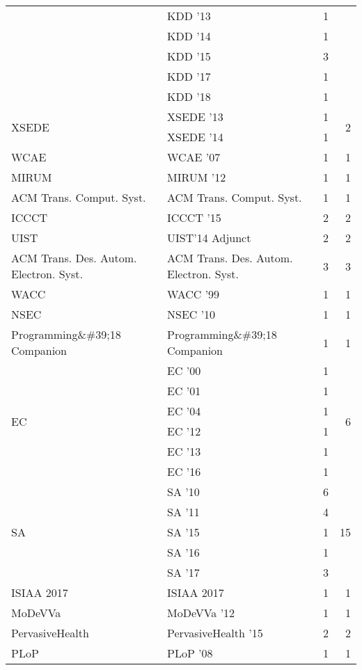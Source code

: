 \begin{table*}[t]
\begin{tabular}{llrr}
& KDD '13 & 1 &\\
& KDD '14 & 1 &\\
& KDD '15 & 3 &\\
& KDD '17 & 1 &\\
& KDD '18 & 1 &\\
\multirow{2}{*}{XSEDE } & XSEDE '13 & 1 & \multirow{2}{*}{2}\\
& XSEDE '14 & 1 &\\
\multirow{1}{*}{WCAE } & WCAE '07 & 1 & \multirow{1}{*}{1}\\
\multirow{1}{*}{MIRUM } & MIRUM '12 & 1 & \multirow{1}{*}{1}\\
\multirow{1}{*}{ACM Trans. Comput. Syst.} & ACM Trans. Comput. Syst. & 1 & \multirow{1}{*}{1}\\
\multirow{1}{*}{ICCCT } & ICCCT '15 & 2 & \multirow{1}{*}{2}\\
\multirow{1}{*}{UIST} & UIST'14 Adjunct & 2 & \multirow{1}{*}{2}\\
\multirow{1}{*}{ACM Trans. Des. Autom. Electron. Syst.} & ACM Trans. Des. Autom. Electron. Syst. & 3 & \multirow{1}{*}{3}\\
\multirow{1}{*}{WACC } & WACC '99 & 1 & \multirow{1}{*}{1}\\
\multirow{1}{*}{NSEC } & NSEC '10 & 1 & \multirow{1}{*}{1}\\
\multirow{1}{*}{Programming\&\#39;18 Companion} & Programming\&\#39;18 Companion & 1 & \multirow{1}{*}{1}\\
\multirow{6}{*}{EC } & EC '00 & 1 & \multirow{6}{*}{6}\\
& EC '01 & 1 &\\
& EC '04 & 1 &\\
& EC '12 & 1 &\\
& EC '13 & 1 &\\
& EC '16 & 1 &\\
\multirow{5}{*}{SA } & SA '10 & 6 & \multirow{5}{*}{15}\\
& SA '11 & 4 &\\
& SA '15 & 1 &\\
& SA '16 & 1 &\\
& SA '17 & 3 &\\
\multirow{1}{*}{ISIAA 2017} & ISIAA 2017 & 1 & \multirow{1}{*}{1}\\
\multirow{1}{*}{MoDeVVa } & MoDeVVa '12 & 1 & \multirow{1}{*}{1}\\
\multirow{1}{*}{PervasiveHealth } & PervasiveHealth '15 & 2 & \multirow{1}{*}{2}\\
\multirow{1}{*}{PLoP } & PLoP '08 & 1 & \multirow{1}{*}{1}\\

\end{tabular}
\end{table*}
